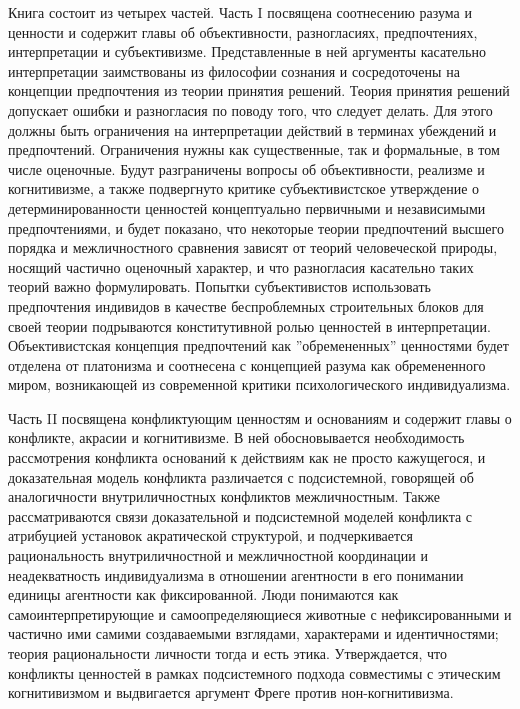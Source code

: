 \documentclass[11pt]{book}
\begin{document}
Книга состоит из четырех частей. Часть I посвящена соотнесению разума и ценности и содержит главы об объективности, разногласиях, предпочтениях, интерпретации и субъективизме. Представленные в ней аргументы касательно интерпретации заимствованы из философии сознания и сосредоточены на концепции предпочтения из теории принятия решений. Теория принятия решений допускает ошибки и разногласия по поводу того, что следует делать. Для этого должны быть ограничения на интерпретации действий в терминах убеждений и предпочтений. Ограничения нужны как существенные, так и формальные, в том числе оценочные. Будут разграничены вопросы об объективности, реализме и когнитивизме, а также подвергнуто критике субъективистское утверждение о детерминированности ценностей концептуально первичными и независимыми предпочтениями, и будет показано, что некоторые теории предпочтений высшего порядка и межличностного сравнения зависят от теорий человеческой природы, носящий частично оценочный характер, и что разногласия касательно таких теорий важно формулировать. Попытки субъективистов использовать предпочтения индивидов в качестве беспроблемных строительных блоков для своей теории подрываются конститутивной ролью ценностей в интерпретации. Объективистская концепция предпочтений как ''обремененных'' ценностями будет отделена от платонизма и соотнесена с концепцией разума как обремененного миром, возникающей из современной критики психологического индивидуализма.

Часть II посвящена конфликтующим ценностям и основаниям и содержит главы о конфликте, акрасии и когнитивизме. В ней обосновывается необходимость рассмотрения конфликта оснований к действиям как не просто кажущегося, и доказательная модель конфликта различается с подсистемной, говорящей об аналогичности внутриличностных конфликтов межличностным. Также рассматриваются связи доказательной и подсистемной моделей конфликта с атрибуцией установок акратической структурой, и подчеркивается рациональность внутриличностной и межличностной координации и неадекватность индивидуализма в отношении агентности в его понимании единицы агентности как фиксированной. Люди понимаются как самоинтерпретирующие и самоопределяющиеся животные с нефиксированными и частично ими самими создаваемыми взглядами, характерами и идентичностями; теория рациональности личности тогда и есть этика. Утверждается, что конфликты ценностей в рамках подсистемного подхода совместимы с этическим когнитивизмом и выдвигается аргумент Фреге против нон-когнитивизма.
\end{document}
